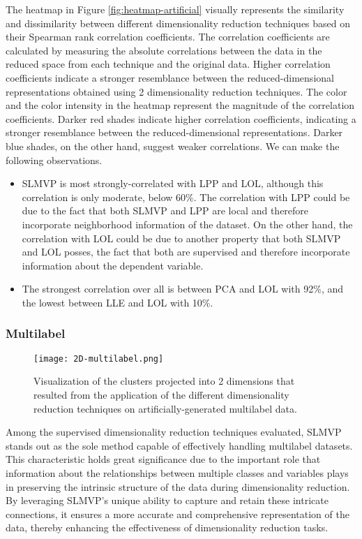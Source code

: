 The heatmap in Figure \ref{fig:heatmap-artificial} visually represents the similarity and dissimilarity between different dimensionality reduction techniques based on their Spearman rank correlation coefficients. The correlation coefficients are calculated by measuring the absolute correlations between the data in the reduced space from each technique and the original data. Higher correlation coefficients indicate a stronger resemblance between the reduced-dimensional representations obtained using 2 dimensionality reduction techniques.
The color and the color intensity in the heatmap represent the magnitude of the correlation coefficients. Darker red shades indicate higher correlation coefficients, indicating a stronger resemblance between the reduced-dimensional representations. Darker blue shades, on the other hand, suggest weaker correlations. We can make the following observations.

\begin{itemize}
    \item SLMVP is most strongly-correlated with LPP and LOL, although this correlation is only moderate, below 60\%. The correlation with LPP could be due to the fact that both SLMVP and LPP are local and therefore incorporate neighborhood information of the dataset. On the other hand, the correlation with LOL could be due to another property that both SLMVP and LOL posses, the fact that both are supervised and therefore incorporate information about the dependent variable.
    \item The strongest correlation over all is between PCA and LOL with 92\%, and the lowest between LLE and LOL with 10\%.
\end{itemize}

\subsubsection{Multilabel}

\begin{figure}[!ht]
    \centering
    \texttt{[image: 2D-multilabel.png]}
    \caption{Visualization of the clusters projected into 2 dimensions that resulted from the application of the different dimensionality reduction techniques on artificially-generated multilabel data.}
    \label{fig:2D_multilabel}
\end{figure}

Among the supervised dimensionality reduction techniques evaluated, SLMVP stands out as the sole method capable of effectively handling multilabel datasets. This characteristic holds great significance due to the important role that information about the relationships between multiple classes and variables plays in preserving the intrinsic structure of the data during dimensionality reduction. By leveraging SLMVP's unique ability to capture and retain these intricate connections, it ensures a more accurate and comprehensive representation of the data, thereby enhancing the effectiveness of dimensionality reduction tasks.

